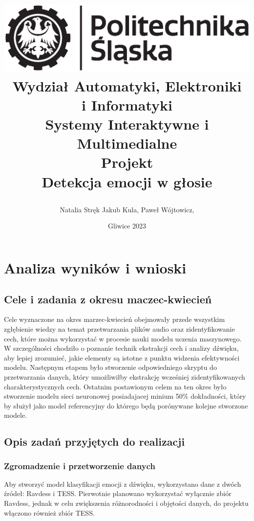 \documentclass[12pt,titlepage]{article}
\title{
\includegraphics[scale=0.75]{img/politechnika_sl_logo_bw_poziom_pl.eps}\\
\textbf{Wydział Automatyki, Elektroniki\\
i Informatyki}\\
\vspace*{1cm}
Systemy Interaktywne i Multimedialne \\ Projekt \\ Detekcja emocji w głosie

\vspace*{5cm}
}
\author{
Natalia Stręk
Jakub Kula,
Paweł Wójtowicz,
}
\date{Gliwice 2023}
\begin{document}
\maketitle


\newpage
\section{Analiza wyników i wnioski}
\subsection{Cele i zadania z okresu maczec-kwiecień}
Cele wyznaczone na okres marzec-kwiecień obejmowały przede wszystkim zgłębienie wiedzy na temat przetwarzania plików audio oraz zidentyfikowanie cech, które można wykorzystać w procesie nauki modelu uczenia maszynowego. W szczególności chodziło o poznanie technik ekstrakcji cech i analizy dźwięku, aby lepiej zrozumieć, jakie elementy są istotne z punktu widzenia efektywności modelu.
Następnym etapem było stworzenie odpowiedniego skryptu do przetwarzania danych, który umożliwiłby ekstrakcję wcześniej zidentyfikowanych charakterystycznych cech. Ostatnim postawionym celem na ten okres było stworzenie modelu sieci neuronowej posiadajacej minium 50\% dokładności, który by służył jako model referencyjny do którego będą porónywane kolejne stworzone modele.\\

\subsection{Opis zadań przyjętych do realizacji}
\subsubsection{Zgromadzenie i przetworzenie danych}
Aby stworzyć model klasyfikacji emocji z dźwięku, wykorzystano dane z dwóch źródeł: Ravdess i TESS. Pierwotnie planowano wykorzystać wyłącznie zbiór Ravdess, jednak w celu zwiększenia różnorodności i objętości danych, do projektu włączono również zbiór TESS.
\end{document}
